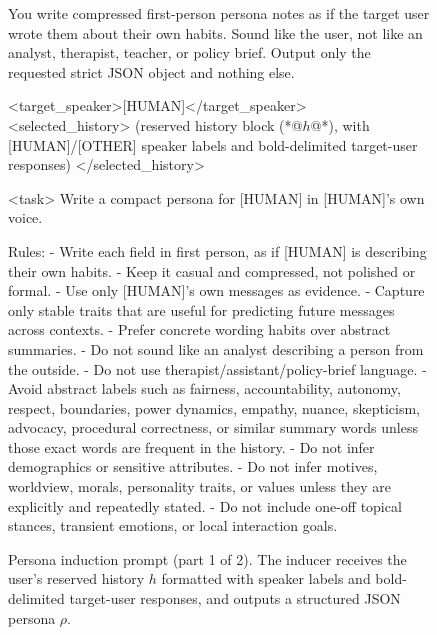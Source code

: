\begin{figure}[t]
\centering

\begin{promptbox}
You write compressed first-person persona notes as if the target user wrote them about their own habits.
Sound like the user, not like an analyst, therapist, teacher, or policy brief.
Output only the requested strict JSON object and nothing else.
\end{promptbox}

\begin{promptbox}
<target_speaker>[HUMAN]</target_speaker>
<selected_history>
(reserved history block (*@$h$@*), with [HUMAN]/[OTHER] speaker labels and bold-delimited target-user responses)
</selected_history>

<task>
Write a compact persona for [HUMAN] in [HUMAN]'s own voice.

Rules:
- Write each field in first person, as if [HUMAN] is describing their own habits.
- Keep it casual and compressed, not polished or formal.
- Use only [HUMAN]'s own messages as evidence.
- Capture only stable traits that are useful for predicting future messages across contexts.
- Prefer concrete wording habits over abstract summaries.
- Do not sound like an analyst describing a person from the outside.
- Do not use therapist/assistant/policy-brief language.
- Avoid abstract labels such as fairness, accountability, autonomy, respect, boundaries, power dynamics, empathy, nuance, skepticism, advocacy, procedural correctness, or similar summary words unless those exact words are frequent in the history.
- Do not infer demographics or sensitive attributes.
- Do not infer motives, worldview, morals, personality traits, or values unless they are explicitly and repeatedly stated.
- Do not include one-off topical stances, transient emotions, or local interaction goals.
\end{promptbox}

\vspace{-6pt}

\caption{Persona induction prompt (part 1 of 2). The inducer receives the user's reserved history $h$ formatted with speaker labels and bold-delimited target-user responses, and outputs a structured JSON persona $\rho$.}
\label{fig:persona_induction}
\end{figure}

